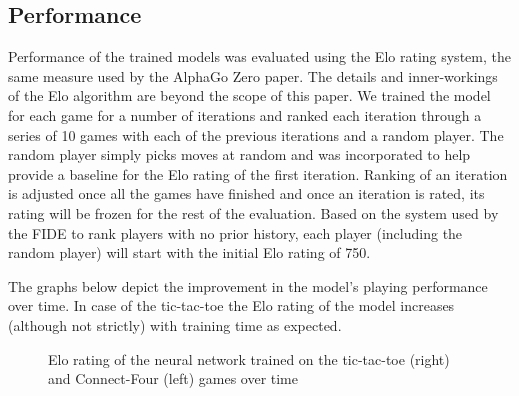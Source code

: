 \documentclass[english]{article}
\begin{document}
\subsection{Performance}

Performance of the trained models was evaluated using the Elo\cite{Elo} rating
system, the same measure used by the AlphaGo Zero paper. The details and
inner-workings of the Elo algorithm are beyond the scope of this paper. We
trained the model for each game for a number of iterations and ranked each
iteration through a series of 10 games with each of the previous iterations and a random
player. The random player simply picks moves at random and was incorporated to help
provide a baseline for the Elo rating of the first iteration. Ranking of an
iteration is adjusted once all the games have finished and once an iteration is
rated, its rating will be frozen for the rest of the evaluation. Based on the
system used by the FIDE \cite{Elo} to rank players with no prior history, each player (including the random player) will start with the initial Elo rating of 750. 

The graphs below depict the improvement in the model's playing performance over time. In case of the tic-tac-toe the Elo rating of the model increases (although not strictly) with training time as expected.

\begin{figure}[h]
\centering
{}
\caption{Elo rating of the neural network trained on the tic-tac-toe (right) and Connect-Four (left) games over time}
\end{figure}
\end{document}
